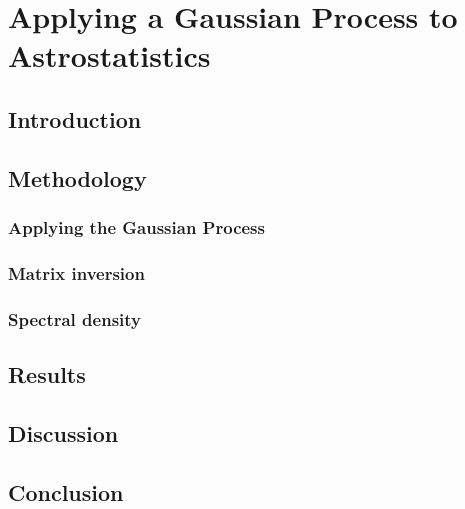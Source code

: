 \section{Applying a Gaussian Process to Astrostatistics}
% 
% 
% 
% 
% 
% 
% 
% 


\subsection{Introduction}



\subsection{Methodology}


\subsubsection{Applying the Gaussian Process}


\subsubsection{Matrix inversion}


\subsubsection{Spectral density}


\subsection{Results}


\subsection{Discussion}


\subsection{Conclusion}

